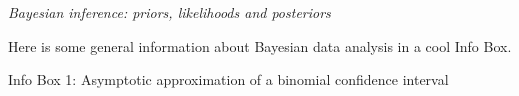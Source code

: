 \documentclass[nobib]{tufte-handout}
\begin{document}
\begin{InfoBox}[t]
\centering
\colorbox{mygray}{\centering
  \begin{minipage}{1.0\textwidth}

    \emph{Bayesian inference: priors, likelihoods and posteriors}
    \medskip

    Here is some general information about Bayesian data analysis in a cool Info Box.
  \end{minipage} \par
  } \par
  \begin{center}
    Info Box 1: Asymptotic approximation of a binomial confidence interval
  \end{center}
\end{InfoBox}






\printbibliography[heading=bibintoc]
\end{document}
